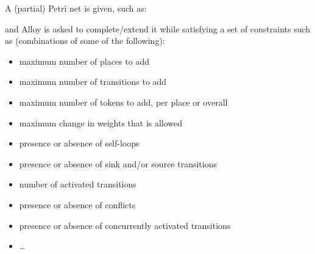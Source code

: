 \documentclass{article}
\begin{document}
A (partial) Petri net is given, such as:
\begin{center}
\end{center}
and Alloy is asked to complete/extend it while satisfying a set of constraints such as (combinations of some of the following):
\begin{itemize}
\item
  maximum number of places to add
\item
  maximum number of transitions to add
\item
  maximum number of tokens to add, per place or overall
\item
  maximum change in weights that is allowed
\item
  presence or absence of self-loops
\item
  presence or absence of sink and/or source transitions
\item
  number of activated transitions
\item
  presence or absence of conflicts
\item
  presence or absence of concurrently activated transitions
\item
  \dots
\end{itemize}
\end{document}
